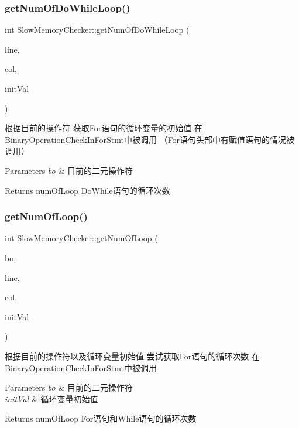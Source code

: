 \subsubsection{\texorpdfstring{get\+Num\+Of\+Do\+While\+Loop()}{getNumOfDoWhileLoop()}}
{\footnotesize\ttfamily int Slow\+Memory\+Checker\+::get\+Num\+Of\+Do\+While\+Loop (\begin{DoxyParamCaption}\item[{int}]{line,  }\item[{int}]{col,  }\item[{int}]{init\+Val }\end{DoxyParamCaption})}

根据目前的操作符 获取\+For语句的循环变量的初始值 在\+Binary\+Operation\+Check\+In\+For\+Stmt中被调用 （\+For语句头部中有赋值语句的情况被调用） 
\begin{DoxyParams}{Parameters}
{\em bo} & 目前的二元操作符 \\
\hline
\end{DoxyParams}
\begin{DoxyReturn}{Returns}
num\+Of\+Loop Do\+While语句的循环次数 
\end{DoxyReturn}
\mbox{\label{classSlowMemoryChecker_a0ab606cbdde59e08633052c1f14d9943}} 
\subsubsection{\texorpdfstring{get\+Num\+Of\+Loop()}{getNumOfLoop()}}
{\footnotesize\ttfamily int Slow\+Memory\+Checker\+::get\+Num\+Of\+Loop (\begin{DoxyParamCaption}\item[{Binary\+Operator $\ast$}]{bo,  }\item[{int}]{line,  }\item[{int}]{col,  }\item[{int}]{init\+Val }\end{DoxyParamCaption})}

根据目前的操作符以及循环变量初始值 尝试获取\+For语句的循环次数 在\+Binary\+Operation\+Check\+In\+For\+Stmt中被调用 
\begin{DoxyParams}{Parameters}
{\em bo} & 目前的二元操作符 \\
\hline
{\em init\+Val} & 循环变量初始值 \\
\hline
\end{DoxyParams}
\begin{DoxyReturn}{Returns}
num\+Of\+Loop For语句和\+While语句的循环次数 
\end{DoxyReturn}
\mbox{\label{classSlowMemoryChecker_a33f70c0075e5258d7f0a9ee80e17aa51}} 
